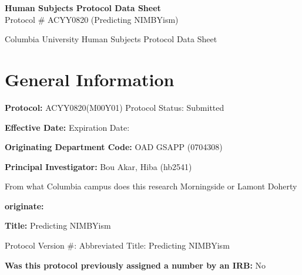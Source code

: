 \documentclass[10pt, letterpaper]{article}
\begin{document}
\vspace*{0.2cm}
\begin{center}
    {\Large \textbf{\color{columbiablue_official} Human Subjects Protocol Data Sheet}} \\[0.5em]
    {\large Protocol \# ACYY0820 (Predicting NIMBYism)}
\end{center}

\vspace{0.3cm}

\begin{responsebox}

Columbia University Human Subjects Protocol Data Sheet

\vspace{0.5em}

\vspace{0.5em}

\vspace{0.5em}

\end{responsebox}

\section*{General Information}

\vspace{0.5em}

\vspace{0.5em}

\noindent \textbf{Protocol:}                  ACYY0820(M00Y01)          Protocol Status:           Submitted

\noindent \textbf{Effective Date:}                                      Expiration Date:

\noindent \textbf{Originating Department Code:}                         OAD GSAPP (0704308)

\noindent \textbf{Principal Investigator:}                              Bou Akar, Hiba (hb2541)

From what Columbia campus does this research         Morningside or Lamont Doherty

\noindent \textbf{originate:}

\noindent \textbf{Title:}                     Predicting NIMBYism

Protocol Version \#:                                  Abbreviated Title:         Predicting NIMBYism

\noindent \textbf{Was this protocol previously assigned a number by an IRB:}                       No
\end{document}
